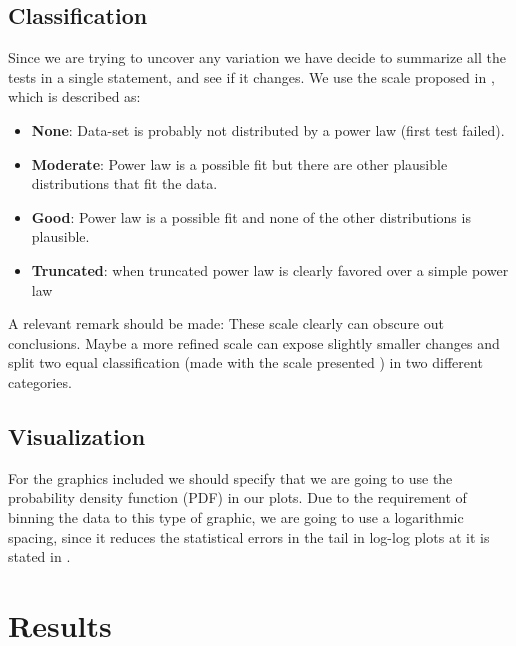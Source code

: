\documentclass[conference]{IEEEtran}
\begin{document}
\subsection{Classification}

Since we are trying to uncover any variation we have decide to
summarize all the tests in a single statement, and see if it
changes. We use the scale proposed in \cite{clauset2009power}, which
is described as:
\begin{itemize}
\item \textbf{None}: Data-set is probably not distributed by a power
  law (first test failed).
\item \textbf{Moderate}: Power law is a possible fit but there are
  other plausible distributions that fit the data.
\item \textbf{Good}: Power law is a possible fit and none of the other
  distributions is plausible.
\item \textbf{Truncated}: when truncated power law is clearly favored
  over a simple power law
\end{itemize}

A relevant remark should be made: These scale clearly can obscure out
conclusions.  Maybe a more refined scale can expose slightly smaller
changes and split two equal classification (made with the scale
presented ) in two different categories.

\subsection{Visualization}
 
For the graphics included we should specify that we are going to use
the probability density function (PDF) in our plots. Due to the
requirement of binning the data to this type of graphic, we are going
to use a logarithmic spacing, since it reduces the statistical errors
in the tail in log-log plots at it is stated in
\cite{newman2005power}.





\section{Results}
\label{res}
\end{document}
